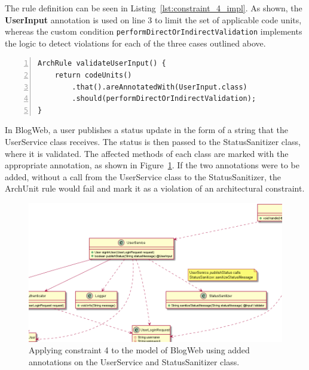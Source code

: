 The rule definition can be seen in Listing~\ref{lst:constraint_4_impl}. As shown, the \textbf{UserInput} annotation is used on line 3 to limit the set of applicable code units, whereas the custom condition \texttt{performDirectOrIndirectValidation} implements the logic to detect violations for each of the three cases outlined above.
    
\begin{minipage}{\linewidth}
\begin{lstlisting}[caption={Rule definition for constraint 4.}, captionpos=b, label=lst:constraint_4_impl, numbers=left]
ArchRule validateUserInput() {
    return codeUnits()
        .that().areAnnotatedWith(UserInput.class)
        .should(performDirectOrIndirectValidation);
}
\end{lstlisting}
\end{minipage}

In BlogWeb, a user publishes a status update in the form of a string that the UserService class receives. The status is then passed to the StatusSanitizer class, where it is validated. The affected methods of each class are marked with the appropriate annotation, as shown in Figure~\ref{fig:validate_input_toy_system}. If the two annotations were to be added, without a call from the UserService class to the StatusSanitizer, the ArchUnit rule would fail and mark it as a violation of an architectural constraint.

\begin{figure}
    \centering
    \includegraphics[width=\textwidth]{figure/toyexamples/validate_input_toy_system.png}
    \caption{Applying constraint 4 to the model of BlogWeb using added annotations on the UserService and StatusSanitizer class.}
    \label{fig:validate_input_toy_system}
\end{figure}


